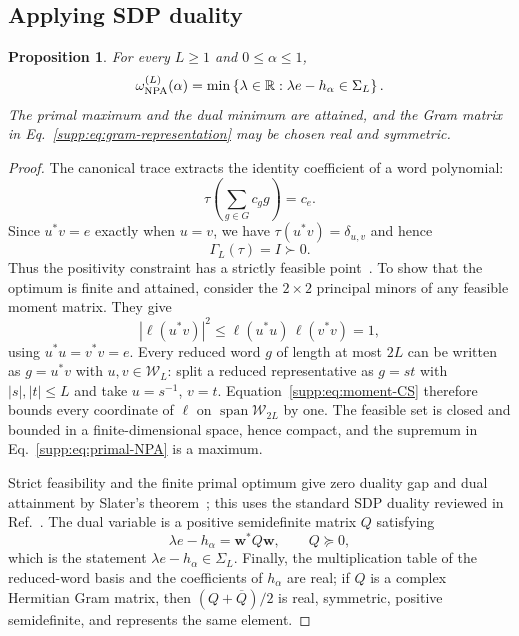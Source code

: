 \documentclass[aps,prl,onecolumn,10pt,superscriptaddress,nofootinbib,longbibliography]{revtex4-2}
\newtheorem{proposition}[theorem]{Proposition}
\theoremstyle{remark}
\newcommand{\R}{\mathbb R}
\newcommand{\Span}{\operatorname{span}}
\begin{document}
\subsection{Applying SDP duality}

\begin{proposition}
\label{supp:prop:duality}
For every $L\geq1$ and $0\leq\alpha\leq1$,
\begin{equation}
\omega_{\rm NPA}^{(L)}(\alpha)=
\min\left\{\lambda\in\R:\lambda e-h_\alpha\in\Sigma_L\right\}.
\label{supp:eq:dual-NPA}
\end{equation}
The primal maximum and the dual minimum are attained, and the Gram matrix in Eq.~\eqref{supp:eq:gram-representation} may be chosen real and symmetric.
\end{proposition}

\begin{proof}
The canonical trace extracts the identity coefficient of a word polynomial:
\begin{equation}
\tau\!\left(\sum_{g\in G}c_gg\right)=c_e.
\label{supp:eq:canonical-trace}
\end{equation}
Since $u^*v=e$ exactly when $u=v$, we have $\tau(u^*v)=\delta_{u,v}$ and hence
\begin{equation}
\Gamma_L(\tau)=I\succ0.
\label{supp:eq:strict-feasibility}
\end{equation}
Thus the positivity constraint has a strictly feasible point~\cite[Appendix~C]{Tavakoli2024}. To show that the optimum is finite and attained, consider the $2\times2$ principal minors of any feasible moment matrix. They give
\begin{equation}
|\ell(u^*v)|^2\leq\ell(u^*u)\,\ell(v^*v)=1,
\label{supp:eq:moment-CS}
\end{equation}
using $u^*u=v^*v=e$. Every reduced word $g$ of length at most $2L$ can be written as $g=u^*v$ with $u,v\in\mathcal W_L$: split a reduced representative as $g=st$ with $|s|,|t|\leq L$ and take $u=s^{-1}$, $v=t$. Equation~\eqref{supp:eq:moment-CS} therefore bounds every coordinate of $\ell$ on $\Span\mathcal W_{2L}$ by one. The feasible set is closed and bounded in a finite-dimensional space, hence compact, and the supremum in Eq.~\eqref{supp:eq:primal-NPA} is a maximum.

Strict feasibility and the finite primal optimum give zero duality gap and dual attainment by Slater's theorem~\cite{BoydVandenberghe2004}; this uses the standard SDP duality reviewed in Ref.~\cite{VandenbergheBoyd1996}. The dual variable is a positive semidefinite matrix $Q$ satisfying
\begin{equation}
\lambda e-h_\alpha=\bm w^*Q\bm w,
\qquad Q\succeq0,
\label{supp:eq:dual-gram}
\end{equation}
which is the statement $\lambda e-h_\alpha\in\Sigma_L$. Finally, the multiplication table of the reduced-word basis and the coefficients of $h_\alpha$ are real; if $Q$ is a complex Hermitian Gram matrix, then $(Q+\overline Q)/2$ is real, symmetric, positive semidefinite, and represents the same element.
\end{proof}
\end{document}
